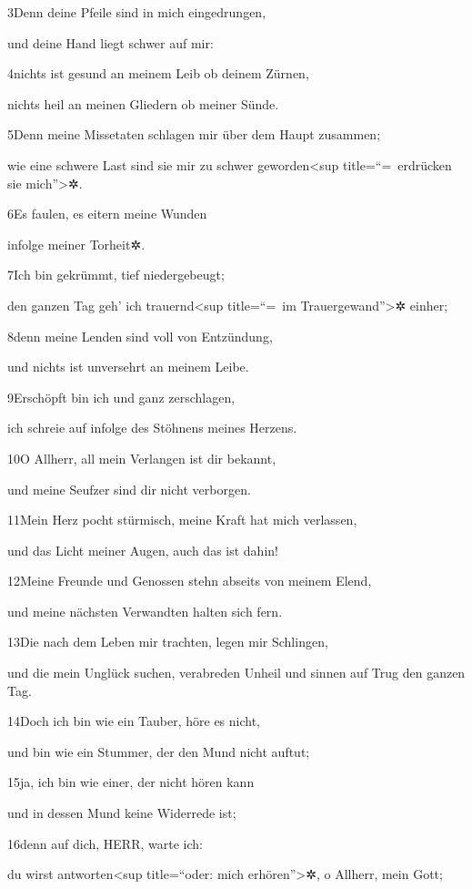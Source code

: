 3Denn deine Pfeile sind in mich eingedrungen,

und deine Hand liegt schwer auf mir:

4nichts ist gesund an meinem Leib ob deinem Zürnen,

nichts heil an meinen Gliedern ob meiner Sünde.

5Denn meine Missetaten schlagen mir über dem Haupt zusammen;

wie eine schwere Last sind sie mir zu schwer geworden\textless sup
title=``=~erdrücken sie mich''\textgreater✲.

6Es faulen, es eitern meine Wunden

infolge meiner Torheit✲.

7Ich bin gekrümmt, tief niedergebeugt;

den ganzen Tag geh' ich trauernd\textless sup title=``=~im
Trauergewand''\textgreater✲ einher;

8denn meine Lenden sind voll von Entzündung,

und nichts ist unversehrt an meinem Leibe.

9Erschöpft bin ich und ganz zerschlagen,

ich schreie auf infolge des Stöhnens meines Herzens.

10O Allherr, all mein Verlangen ist dir bekannt,

und meine Seufzer sind dir nicht verborgen.

11Mein Herz pocht stürmisch, meine Kraft hat mich verlassen,

und das Licht meiner Augen, auch das ist dahin!

12Meine Freunde und Genossen stehn abseits von meinem Elend,

und meine nächsten Verwandten halten sich fern.

13Die nach dem Leben mir trachten, legen mir Schlingen,

und die mein Unglück suchen, verabreden Unheil und sinnen auf Trug den
ganzen Tag.

14Doch ich bin wie ein Tauber, höre es nicht,

und bin wie ein Stummer, der den Mund nicht auftut;

15ja, ich bin wie einer, der nicht hören kann

und in dessen Mund keine Widerrede ist;

16denn auf dich, HERR, warte ich:

du wirst antworten\textless sup title=``oder: mich
erhören''\textgreater✲, o Allherr, mein Gott;

